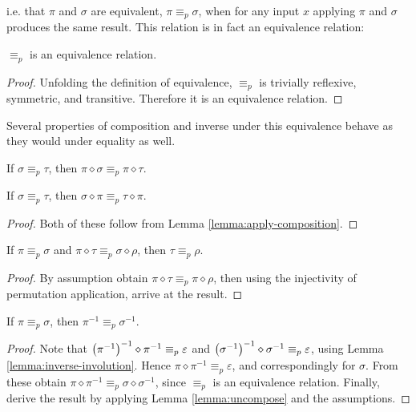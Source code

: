 i.e. that \(\pi\) and \(\sigma\) are equivalent, \(\pi \equiv_p \sigma\),  when for any input \(x\) applying \(\pi\) and \(\sigma\) produces the same result.
This relation is in fact an equivalence relation:

\begin{lemma}
\(\equiv_p\) is an equivalence relation.
\end{lemma}
\begin{proof}
Unfolding the definition of equivalence, \(\equiv_p\) is trivially reflexive, symmetric, and transitive.
Therefore it is an equivalence relation.
\end{proof}

Several properties of composition and inverse under this equivalence behave as they would under equality as well.

\begin{lemma}
If \(\sigma \equiv_p \tau\), then \(\pi \diamond \sigma \equiv_p \pi \diamond \tau\).
\end{lemma}
\begin{lemma}
If \(\sigma \equiv_p \tau\), then \(\sigma \diamond \pi \equiv_p \tau \diamond \pi\).
\end{lemma}
\begin{proof}
Both of these follow from Lemma \ref{lemma:apply-composition}.
\end{proof}

\begin{lemma}
\label{lemma:uncompose}
If \(\pi \equiv_p \sigma\) and \(\pi \diamond \tau \equiv_p \sigma \diamond \rho\),
then \(\tau \equiv_p \rho\).
\end{lemma}
\begin{proof}
By assumption obtain \(\pi \diamond \tau \equiv_p \pi \diamond \rho\), then using the injectivity of permutation application, arrive at the result.
\end{proof}

\begin{lemma}
If \(\pi \equiv_p \sigma\), then \(\pi^{-1} \equiv_p \sigma^{-1}\).
\end{lemma}
\begin{proof}
Note that \(\left(\pi^{-1}\right)^{-1} \diamond \pi^{-1} \equiv_p \varepsilon\) and \(\left(\sigma^{-1}\right)^{-1} \diamond \sigma^{-1} \equiv_p \varepsilon\), using Lemma \ref{lemma:inverse-involution}.
Hence \(\pi \diamond \pi^{-1} \equiv_p \varepsilon\), and correspondingly for \(\sigma\).
From these obtain \(\pi \diamond \pi^{-1} \equiv_p \sigma \diamond \sigma^{-1}\), since \(\equiv_p\) is an equivalence relation.
Finally, derive the result by applying Lemma \ref{lemma:uncompose} and the assumptions.
\end{proof}


